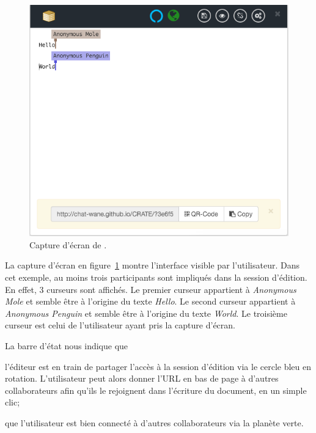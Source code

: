 \begin{figure}
  \begin{center}
    \includegraphics[scale=0.6]{img/editor/cratescreenshot.png}
    \caption[Capture d'écran de \CRATE]
    {\label{editor:img:screenshot}Capture d'écran de \CRATE.}
  \end{center}
\end{figure}

La capture d'écran en figure~\ref{editor:img:screenshot} montre l'interface
visible par l'utilisateur. Dans cet exemple, au moins trois participants sont
impliqués dans la session d'édition. En effet, 3 curseurs sont affichés. Le
premier curseur appartient à \emph{Anonymous Mole} et semble être à l'origine du
texte \emph{Hello}. Le second curseur appartient à \emph{Anonymous Penguin} et
semble être à l'origine du texte \emph{World}. Le troisième curseur est celui de
l'utilisateur ayant pris la capture d'écran.

La barre d'état nous indique que
\begin{inparaenum}[(i)]
\item l'éditeur est en train de partager l'accès à la session d'édition via le
  cercle bleu en rotation. L'utilisateur peut alors donner l'URL en bas de page
  à d'autres collaborateurs afin qu'ils le rejoignent dans l'écriture du
  document, en un simple clic;
\item que l'utilisateur est bien connecté à d'autres collaborateurs via la
  planète verte.
\end{inparaenum}

